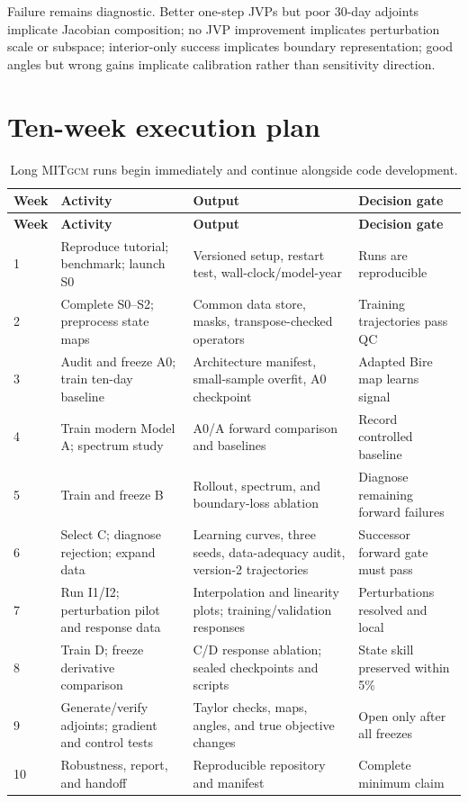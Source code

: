 \documentclass[11pt]{article}
\newcommand{\MITgcm}{\textsc{MITgcm}}
\begin{document}
Failure remains diagnostic. Better one-step JVPs but poor 30-day adjoints implicate
Jacobian composition; no JVP improvement implicates perturbation scale or subspace;
interior-only success implicates boundary representation; good angles but wrong gains
implicate calibration rather than sensitivity direction.

\section{Ten-week execution plan}
{\small
\begin{longtable}{@{}p{}p{}p{}p{}@{}}
\caption{Long \MITgcm{} runs begin immediately and continue alongside code
development.}\label{tab:timeline}\\
\toprule
\textbf{Week} & \textbf{Activity} & \textbf{Output} & \textbf{Decision gate} \\
\midrule
\endfirsthead
\toprule
\textbf{Week} & \textbf{Activity} & \textbf{Output} & \textbf{Decision gate} \\
\midrule
\endhead
1 & Reproduce tutorial; benchmark; launch S0 & Versioned setup, restart test, wall-clock/model-year & Runs are reproducible \\
2 & Complete S0--S2; preprocess state maps & Common data store, masks, transpose-checked operators & Training trajectories pass QC \\
3 & Audit and freeze A0; train ten-day baseline & Architecture manifest, small-sample overfit, A0 checkpoint & Adapted Bire map learns signal \\
4 & Train modern Model A; spectrum study & A0/A forward comparison and baselines & Record controlled baseline \\
5 & Train and freeze B & Rollout, spectrum, and boundary-loss ablation & Diagnose remaining forward failures \\
6 & Select C; diagnose rejection; expand data & Learning curves, three seeds, data-adequacy audit, version-2 trajectories & Successor forward gate must pass \\
7 & Run I1/I2; perturbation pilot and response data & Interpolation and linearity plots; training/validation responses & Perturbations resolved and local \\
8 & Train D; freeze derivative comparison & C/D response ablation; sealed checkpoints and scripts & State skill preserved within 5\% \\
9 & Generate/verify adjoints; gradient and control tests & Taylor checks, maps, angles, and true objective changes & Open only after all freezes \\
10 & Robustness, report, and handoff & Reproducible repository and manifest & Complete minimum claim \\
\bottomrule
\end{longtable}
}
\end{document}
